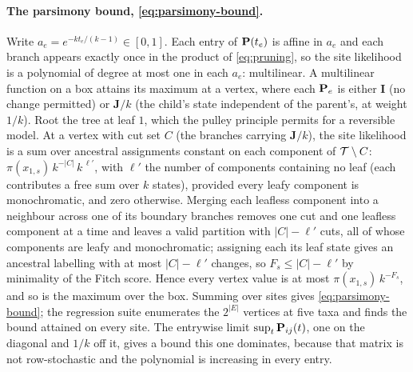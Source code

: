 \documentclass[11pt,a4paper]{article}
\begin{document}
\paragraph{The parsimony bound, \eqref{eq:parsimony-bound}.}
Write $a_e = e^{-k t_e/(k-1)} \in [0,1]$. Each entry of $\mathbf{P}(t_e)$ is affine
in $a_e$ and each branch appears exactly once in the product of
\eqref{eq:pruning}, so the site likelihood is a polynomial of degree at most
one in each $a_e$: multilinear. A multilinear function on a box attains its
maximum at a vertex, where each $\mathbf{P}_e$ is either $\mathbf{I}$ (no change
permitted) or $\mathbf{J}/k$ (the child's state independent of the parent's,
at weight $1/k$). Root the tree at leaf $1$, which the pulley principle
permits for a reversible model. At a vertex with cut set $C$ (the branches
carrying $\mathbf{J}/k$), the site likelihood is a sum over ancestral
assignments constant on each component of $\mathcal{T} \setminus C$:
$\pi(x_{1,s})\,k^{-|C|}\,k^{\,\ell'}$, with $\ell'$ the number of
components containing no leaf (each contributes a free sum over $k$ states),
provided every leafy component is monochromatic, and zero otherwise.
Merging each leafless component into a neighbour across one of its boundary
branches removes one cut and one leafless component at a time and leaves a
valid partition with $|C| - \ell'$ cuts, all of whose components are leafy
and monochromatic; assigning each its leaf state gives an ancestral labelling
with at most $|C| - \ell'$ changes, so $F_s \le |C| - \ell'$ by minimality of
the Fitch score. Hence every vertex value is at most
$\pi(x_{1,s})\,k^{-F_s}$, and so is the maximum over the box. Summing over
sites gives \eqref{eq:parsimony-bound}; the regression suite enumerates the
$2^{|E|}$ vertices at five taxa and finds the bound attained on every site.
The entrywise limit $\sup_t \mathbf{P}_{ij}(t)$, one on the diagonal and $1/k$
off it, gives a bound this one dominates, because that matrix is not
row-stochastic and the polynomial is increasing in every entry.
\end{document}
